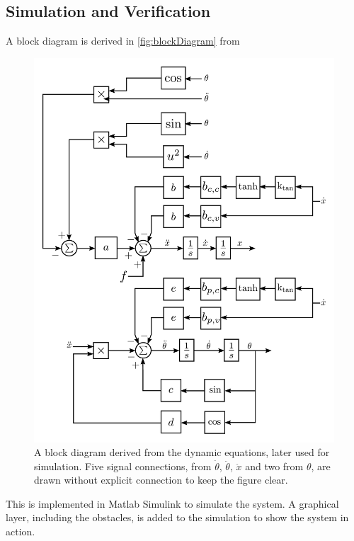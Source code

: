 \subsection{Simulation and Verification}

A block diagram is derived in \autoref{fig:blockDiagram} from %

\begin{figure}[H]
  \includegraphics[width=.7\textwidth]{figures/blockDiagramWithFriction}
  \caption{A block diagram derived from the dynamic equations, later used for simulation. Five signal connections, from $\dot{\theta}$, $\ddot{\theta}$, $\ddot{x}$ and two from $\theta$, are drawn without explicit connection to keep the figure clear.}
  \label{fig:blockDiagram}
\end{figure}

This is implemented in Matlab Simulink to simulate the system. A graphical layer, including the obstacles, is added to the simulation to show the system in action.